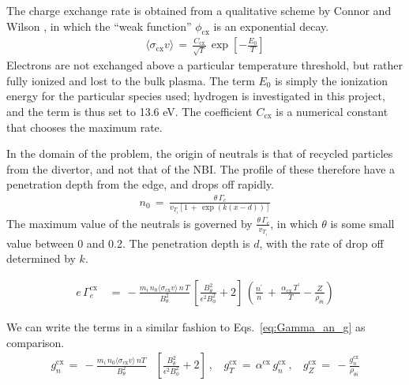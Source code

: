 The charge exchange rate is obtained from a qualitative scheme by Connor and Wilson \cite{connor_review_2000}, in which the ``weak function'' $\phi_\text{cx}$ is an exponential decay.
\begin{align} %
	\langle \sigma_\text{cx} v\rangle \,=\, \frac{C_\text{cx}}{\sqrt{T}} \,
		\exp\left[-\frac{E_0}{T}\right] \label{eq:cx_rate}
\end{align}
Electrons are not exchanged above a particular temperature threshold, but rather fully ionized and lost to the bulk plasma.
The term $E_0$ is simply the ionization energy for the particular species used; hydrogen is investigated in this project, and the term is thus set to 13.6 eV.
The coefficient $C_\text{cx}$ is a numerical constant that chooses the maximum rate.

In the domain of the problem, the origin of neutrals is that of recycled particles from the divertor, and not that of the NBI.
The profile of these therefore have a penetration depth from the edge, and drops off rapidly.
\begin{align}
	n_0 \,=\, \frac{\theta\,\Gamma_c}{v_{T_i}\left[1 \,+\,
	\exp{(k(x - d))}\right]} \label{eq:neutral_density}
\end{align}
The maximum value of the neutrals is governed by $\frac{\theta\,\Gamma_c}{v_{T_i}}$, in which $\theta$ is some small value between 0 and 0.2.
The penetration depth is $d$, with the rate of drop off determined by $k$.

\begin{align} %
	e\,\Gamma_e^\text{cx} \,&=\,
		-\frac{m_i \,n_0 \langle\sigma_\text{cx} v\rangle \, n\,T}{B_\theta^2}
		\, \left[\frac{B_\theta^2}{\epsilon^2 B_\phi^2} + 2\right] \,
		\left(\frac{n^\prime}{n} \,+\, \frac{\alpha_\text{cx}\,T^\prime}
		{T} - \frac{Z}{\rho_{\theta i}}\right) \label{eq:Gamma_cx}
\end{align}

We can write the terms in a similar fashion to Eqs.~\ref{eq:Gamma_an_g} as comparison.
\begin{align} %
	g_n^\text{cx} \,=\, -\frac{m_i \,n_0 \langle\sigma_\text{cx} v\rangle \,n T}
		{B_\theta^2}& \left[\frac{B_\theta^2}{\epsilon^2 B_\phi^2} + 2\right]
		~,~~~~ g_T^\text{cx} \,=\, \alpha^\text{cx}\,g_n^\text{cx}~,~~~~
		g_Z^\text{cx} \,=\, -\frac{g_n^\text{cx}}{\rho_{\theta i}}
		\label{eq:g_cx}
\end{align}


